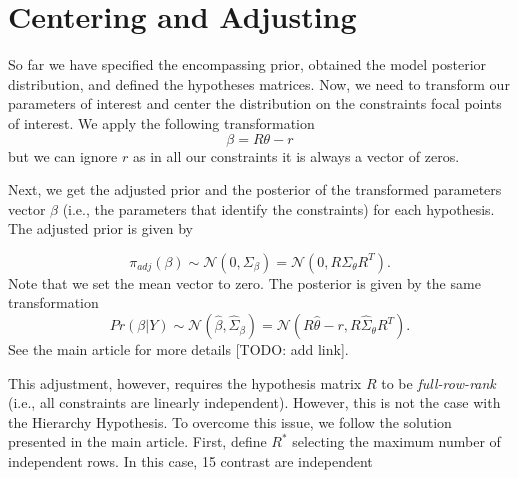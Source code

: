 \documentclass[
]{book}
\begin{document}
\hypertarget{centering-and-adjusting}{%
\section{Centering and Adjusting}\label{centering-and-adjusting}}

So far we have specified the encompassing prior, obtained the model posterior distribution, and defined the hypotheses matrices. Now, we need to transform our parameters of interest and center the distribution on the constraints focal points of interest. We apply the following transformation
\[
\beta = R\theta - r
\]
but we can ignore \(r\) as in all our constraints it is always a vector of zeros.

Next, we get the adjusted prior and the posterior of the transformed parameters vector \(\beta\) (i.e., the parameters that identify the constraints) for each hypothesis. The adjusted prior is given by

\[
\pi_{adj}(\beta) \sim \mathcal{N}(0, \Sigma_{\beta}) = \mathcal{N}(0, R\Sigma_{\theta}R^T).
\]
Note that we set the mean vector to zero. The posterior is given by the same transformation
\[
Pr(\beta|Y) \sim \mathcal{N}(\hat{\beta}, \hat{\Sigma}_{\beta}) = \mathcal{N}(R\hat{\theta}-r, R\hat{\Sigma}_{\theta}R^T).
\]
See the main article for more details {[}TODO: add link{]}.

This adjustment, however, requires the hypothesis matrix \(R\) to be \emph{full-row-rank} (i.e., all constraints are linearly independent). However, this is not the case with the Hierarchy Hypothesis. To overcome this issue, we follow the solution presented in the main article. First, define \(R^*\) selecting the maximum number of independent rows. In this case, 15 contrast are independent
\end{document}
